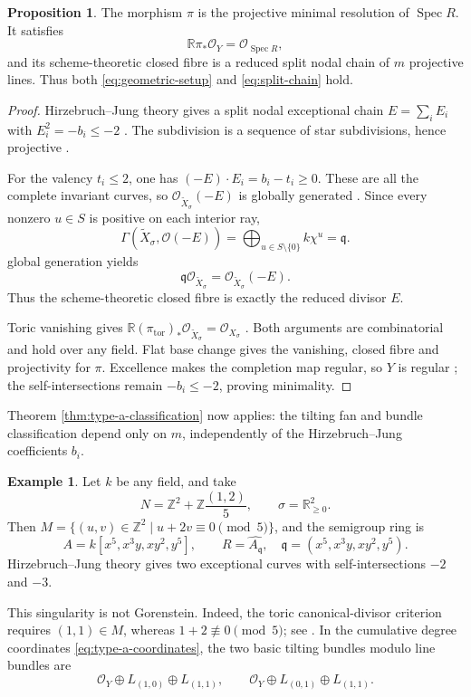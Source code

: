 \documentclass[a4paper,reqno]{amsart}
\def\O{\mathcal{O}}
\DeclareMathOperator{\Spec}{Spec}
\theoremstyle{definition}
\newtheorem{Prop}[Thm]{Proposition}
\newtheorem{Ex}[Thm]{Example}
\begin{document}
\begin{Prop}\label{prop:toric-split-fibre}
The morphism $\pi$ is the projective minimal resolution of $\Spec R$. It satisfies
\[
\mathbb R\pi_*\O_Y=\O_{\Spec R},
\]
and its scheme-theoretic closed fibre is a reduced split nodal chain of $m$ projective lines. Thus both \eqref{eq:geometric-setup} and \eqref{eq:split-chain} hold.
\end{Prop}
\begin{proof}
Hirzebruch--Jung theory gives a split nodal exceptional chain $E=\sum_iE_i$ with $E_i^2=-b_i\le-2$ \cite[Theorems 10.2.3, 10.2.5 and Corollary 10.4.9]{CLS11}. The subdivision is a sequence of star subdivisions, hence projective \cite[Proposition 11.1.6(c)]{CLS11}.

For the valency $t_i\le2$, one has $(-E)\cdot E_i=b_i-t_i\ge0$. These are all the complete invariant curves, so $\O_{\widetilde X_\sigma}(-E)$ is globally generated \cite[Theorem 6.3.12]{CLS11}. Since every nonzero $u\in S$ is positive on each interior ray,
\[
\Gamma(\widetilde X_\sigma,\O(-E))
=\bigoplus_{u\in S\setminus\{0\}}k\chi^u
=\mathfrak q.
\]
global generation yields
\begin{equation}\label{eq:toric-fibre-ideals}
\mathfrak q\O_{\widetilde X_\sigma}=\O_{\widetilde X_\sigma}(-E).
\end{equation}
Thus the scheme-theoretic closed fibre is exactly the reduced divisor $E$.

Toric vanishing gives $\mathbb R(\pi_{\mathrm{tor}})_*\O_{\widetilde X_\sigma}=\O_{X_\sigma}$ \cite[Theorem 9.2.5]{CLS11}. Both arguments are combinatorial and hold over any field. Flat base change gives the vanishing, closed fibre and projectivity for $\pi$. Excellence makes the completion map regular, so $Y$ is regular \cite[Tags 07QS and 07R6]{stacks-project}; the self-intersections remain $-b_i\le-2$, proving minimality.
\end{proof}

Theorem \ref{thm:type-a-classification} now applies: the tilting fan and bundle classification depend only on $m$, independently of the Hirzebruch--Jung coefficients $b_i$.

\begin{Ex}\label{ex:toric-one-fifth}
Let $k$ be any field, and take
\[
N=\mathbb Z^2+\mathbb Z\frac{(1,2)}5,
\qquad\sigma=\mathbb R_{\ge0}^2.
\]
Then $M=\{(u,v)\in\mathbb Z^2\mid u+2v\equiv0\pmod5\}$, and the semigroup ring is
\[
A=k[x^5,x^3y,xy^2,y^5],
\qquad R=\widehat{A_{\mathfrak q}},
\quad\mathfrak q=(x^5,x^3y,xy^2,y^5).
\]
Hirzebruch--Jung theory gives two exceptional curves with self-intersections $-2$ and $-3$.

This singularity is not Gorenstein. Indeed, the toric canonical-divisor criterion requires $(1,1)\in M$, whereas $1+2\not\equiv0\pmod5$; see \cite[Proposition 8.2.12]{CLS11}. In the cumulative degree coordinates \eqref{eq:type-a-coordinates}, the two basic tilting bundles modulo line bundles are
\[
\O_Y\oplus L_{(1,0)}\oplus L_{(1,1)},
\qquad
\O_Y\oplus L_{(0,1)}\oplus L_{(1,1)}.
\]
\end{Ex}
\end{document}
